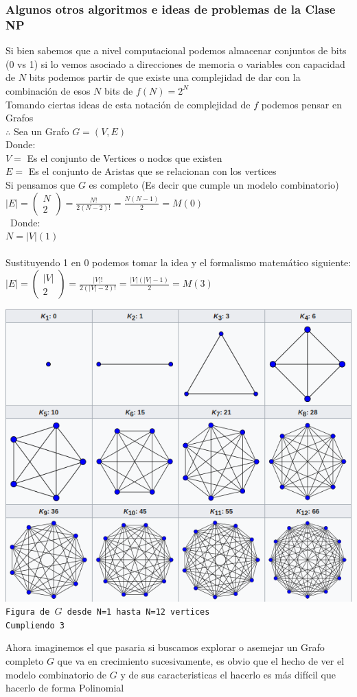 \documentclass[10pt,executivepaper]{article}
\newcommand\tab[1][1cm]{\hspace*{#1}}
\begin{document}
\subsubsection{Algunos otros algoritmos e ideas de problemas de la Clase NP}
Si bien sabemos que a nivel computacional podemos almacenar conjuntos de bits (0 vs 1) si lo vemos asociado a direcciones de memoria o variables con capacidad de $N$ bits podemos partir de que existe una complejidad de dar con la combinación de esos $N$ bits de $f(N)=2^N$ \\
Tomando ciertas ideas de esta notación de complejidad de $f$ podemos pensar en Grafos \\$\therefore$ Sea un Grafo $G=(V,E)$ \\Donde:\\
\tab $V=$ Es el conjunto de Vertices o nodos que existen
\\\tab $E=$ Es el conjunto de Aristas que se relacionan con los vertices\\
Si pensamos que $G$ es completo (Es decir que cumple un modelo combinatorio)\\
\tab\tab$|E|=\begin{pmatrix}
  N\\2
\end{pmatrix} = \frac{N!}{2(N-2)!} = \frac{N(N-1)}{2} = M$\tab$(0)$\\
\tab\ Donde:
\\\tab $N=|V|$\tab$(1)$\\
\\Sustituyendo 1 en 0 podemos tomar la idea y el formalismo matemático siguiente:\\
\tab $|E|=\begin{pmatrix}
  |V|\\2
\end{pmatrix} = \frac{|V|!}{2(|V|-2)!} = \frac{|V| ( |V|-1 )}{2} = M $\tab$(3)$\\
\begin{center}
  \includegraphics[scale=0.5]{images/grafoCompleto.png}\\
  \texttt{Figura de $G$ desde N=1 hasta N=12 vertices\\Cumpliendo 3}
\end{center}
Ahora imaginemos el que pasaria si buscamos explorar o asemejar un Grafo completo $G$ que va en crecimiento sucesivamente, es obvio que el hecho de ver el modelo combinatorio de $G$ y de sus caracteristicas el hacerlo es más difícil que hacerlo de forma Polinomial


\printindex
\end{document}
